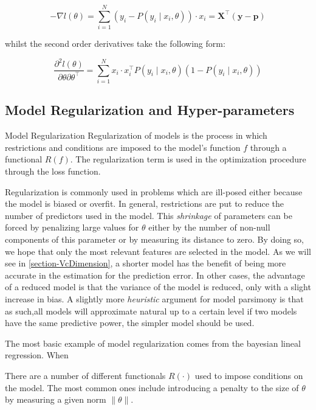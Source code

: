 \[
- \nabla  l(\theta) = \sum_{i=1}^N (y_i - P(y_i \mid x_i,\theta))\cdot x_i = \textbf{X}^{\intercal}(\textbf{y}-\textbf{p})
\]

whilst the second order derivatives take the following form:

\[
\frac{\partial^2 l(\theta)}{\partial \theta \partial \theta^\intercal} = \sum_{i=1}^N x_i \cdot x_i^\intercal P(y_i \mid x_i,\theta)(1 -P(y_i \mid x_i,\theta))
\]



\subsection{Model Regularization and Hyper-parameters} \label{subsection-hyperParametersRegularization}


\begin{definition}{Model Regularization}
	Regularization of models is the process in which restrictions and conditions are imposed  to the model's function $f$ through a functional $ R(f)$. The regularization term is used in the optimization procedure through the loss function.
\end{definition}

Regularization is commonly used in problems which are ill-posed either because the model is biased or overfit. In general, restrictions are put to reduce the number of predictors used in the model. This \textit{shrinkage} of parameters can be forced by penalizing large values for $\theta$ either by the number of non-null components of this parameter or by measuring its distance to zero. By doing so, we hope that only the most relevant features are selected in the model. As we will see in \ref{section-VcDimension}, a shorter model has the benefit of being more accurate in the estimation for the prediction error. In other cases, the advantage of a reduced model is that the variance of the model is reduced, only with a slight increase in bias. A slightly more \textit{heuristic} argument for model parsimony is that as such,all models will approximate natural up to a certain level if two models have the same predictive power, the simpler model should be used.

The most basic example of model regularization comes from the bayesian lineal regression. When 

There are a number of different functionals $R(\cdot)$ used to impose conditions on the model. The most common ones include introducing a penalty to the size of $\theta$ by measuring a given norm  $\| \theta \|$.  

